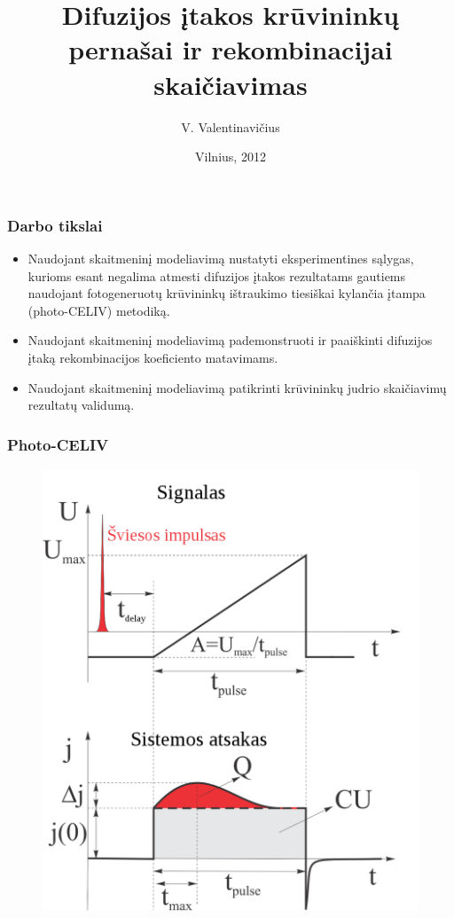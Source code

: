 \documentclass{beamer}
\title{Difuzijos įtakos krūvininkų pernašai ir rekombinacijai skaičiavimas}
\author
{V. Valentinavičius}
\date{Vilnius, 2012}
\begin{document}
\frame{\titlepage}
  \begin{frame}
    \frametitle{Darbo tikslai}
    \begin{itemize}
      \item Naudojant skaitmeninį modeliavimą nustatyti eksperimentines sąlygas, kurioms esant negalima atmesti difuzijos įtakos rezultatams gautiems naudojant fotogeneruotų krūvininkų ištraukimo tiesiškai kylančia įtampa (photo-CELIV) metodiką.
	\item Naudojant skaitmeninį modeliavimą pademonstruoti ir paaiškinti difuzijos įtaką rekombinacijos koeficiento matavimams.
	\item Naudojant skaitmeninį modeliavimą patikrinti krūvininkų judrio skaičiavimų rezultatų validumą.
    \end{itemize}
  \end{frame}
  
  
  \begin{frame}
    \frametitle{Photo-CELIV}
    \begin{figure}
    	\includegraphics[height=0.8\textheight]{./media/celivTransients.png}
    \end{figure}
  \end{frame}
  
\end{document}
